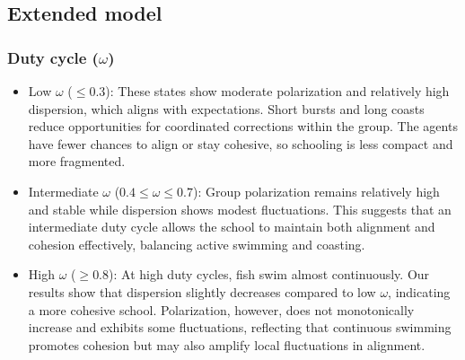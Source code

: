 \subsection{Extended model}

\subsubsection{Duty cycle ($\omega$)}

\begin{itemize}[itemsep=-1mm]
    \item Low $\omega$ ($ \leq 0.3$): These states show moderate polarization and relatively high dispersion, which aligns with expectations. Short bursts and long coasts reduce opportunities for coordinated corrections within the group. The agents have fewer chances to align or stay cohesive, so schooling is less compact and more fragmented.
    
    \item Intermediate $\omega$ ($0.4 \leq \omega \leq 0.7$): Group polarization remains relatively high and stable while dispersion shows modest fluctuations. This suggests that an intermediate duty cycle allows the school to maintain both alignment and cohesion effectively, balancing active swimming and coasting.
    
    \item High $\omega$ ($ \geq 0.8$): At high duty cycles, fish swim almost continuously. Our results show that dispersion slightly decreases compared to low $\omega$, indicating a more cohesive school. Polarization, however, does not monotonically increase and exhibits some fluctuations, reflecting that continuous swimming promotes cohesion but may also amplify local fluctuations in alignment.
\end{itemize}

